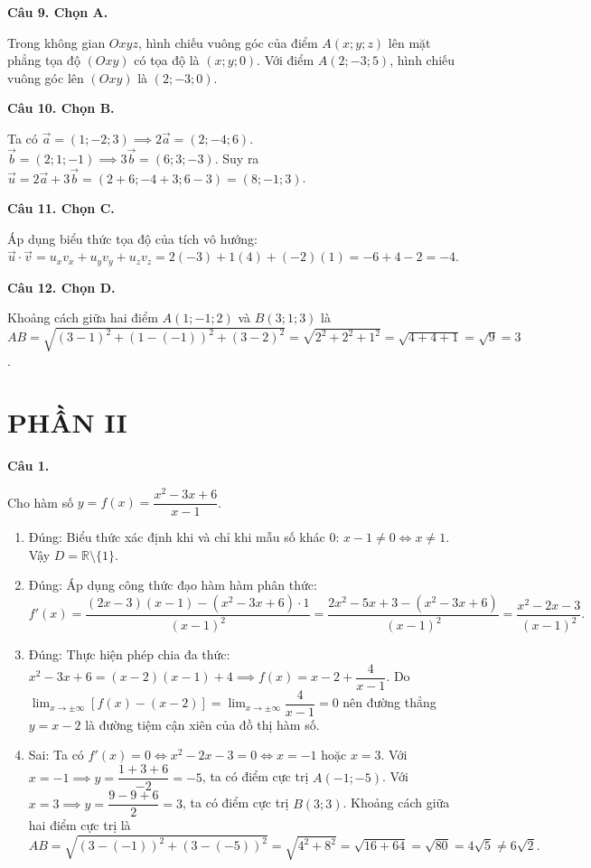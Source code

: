 \documentclass[12pt,a4paper]{article}
\newcommand{\loigiai}[1]{\par\medskip\Needspace{4\baselineskip}\noindent\textbf{#1}\par\nobreak}
\begin{document}
\loigiai{Câu 9. Chọn A.}
Trong không gian $Oxyz$, hình chiếu vuông góc của điểm $A(x;y;z)$ lên mặt phẳng tọa độ $(Oxy)$ có tọa độ là $(x;y;0)$.
Với điểm $A(2;-3;5)$, hình chiếu vuông góc lên $(Oxy)$ là $(2;-3;0)$.

\loigiai{Câu 10. Chọn B.}
Ta có $\vec{a}=(1;-2;3) \implies 2\vec{a}=(2;-4;6)$.
$\vec{b}=(2;1;-1) \implies 3\vec{b}=(6;3;-3)$.
Suy ra $\vec{u}=2\vec{a}+3\vec{b}=(2+6;-4+3;6-3)=(8;-1;3)$.

\loigiai{Câu 11. Chọn C.}
Áp dụng biểu thức tọa độ của tích vô hướng:
$\vec{u}\cdot\vec{v} = u_x v_x + u_y v_y + u_z v_z = 2(-3) + 1(4) + (-2)(1) = -6 + 4 - 2 = -4$.

\loigiai{Câu 12. Chọn D.}
Khoảng cách giữa hai điểm $A(1;-1;2)$ và $B(3;1;3)$ là
$AB=\sqrt{(3-1)^2 + (1-(-1))^2 + (3-2)^2} = \sqrt{2^2+2^2+1^2} = \sqrt{4+4+1} = \sqrt{9}=3$.

\section*{PHẦN II}

\loigiai{Câu 1.}
Cho hàm số $y=f(x)=\dfrac{x^2-3x+6}{x-1}$.
\begin{enumerate}
\item Đúng: Biểu thức xác định khi và chỉ khi mẫu số khác 0: $x-1\ne 0 \iff x\ne 1$. Vậy $D=\mathbb{R}\setminus\{1\}$.
\item Đúng: Áp dụng công thức đạo hàm hàm phân thức:
$$f'(x)=\dfrac{(2x-3)(x-1)-(x^2-3x+6)\cdot 1}{(x-1)^2}=\dfrac{2x^2-5x+3-(x^2-3x+6)}{(x-1)^2}=\dfrac{x^2-2x-3}{(x-1)^2}.$$
\item Đúng: Thực hiện phép chia đa thức:
$x^2-3x+6 = (x-2)(x-1) + 4 \implies f(x) = x-2 + \dfrac{4}{x-1}$.
Do $\lim_{x\to \pm\infty} [f(x)-(x-2)] = \lim_{x\to \pm\infty}\dfrac{4}{x-1}=0$ nên đường thẳng $y=x-2$ là đường tiệm cận xiên của đồ thị hàm số.
\item Sai: Ta có $f'(x)=0 \iff x^2-2x-3=0 \iff x=-1$ hoặc $x=3$.
Với $x=-1 \implies y=\dfrac{1+3+6}{-2}=-5$, ta có điểm cực trị $A(-1;-5)$.
Với $x=3 \implies y=\dfrac{9-9+6}{2}=3$, ta có điểm cực trị $B(3;3)$.
Khoảng cách giữa hai điểm cực trị là
$$AB = \sqrt{(3-(-1))^2 + (3-(-5))^2} = \sqrt{4^2+8^2} = \sqrt{16+64} = \sqrt{80} = 4\sqrt{5} \ne 6\sqrt{2}.$$
\end{enumerate}
\end{document}
